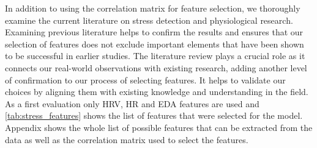 In addition to using the correlation matrix for feature selection, we thoroughly examine the current literature on stress detection and physiological research. Examining previous literature helps to confirm the results and ensures that our selection of features does not exclude important elements that have been shown to be successful in earlier studies. The literature review plays a crucial role as it connects our real-world observations with existing research, adding another level of confirmation to our process of selecting features. It helps to validate our choices by aligning them with existing knowledge and understanding in the field. As a first evaluation only HRV, HR and EDA features are used and \autoref{tab:stress_features} shows the list of features that were selected for the model.
Appendix shows the whole list of possible features that can be extracted from the data as well as the correlation matrix used to select the features.



